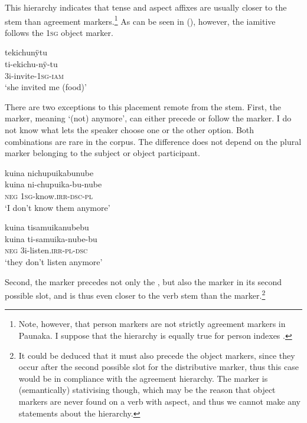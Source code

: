 This hierarchy indicates that tense and aspect affixes are usually closer to the stem than agreement markers.\footnote{Note, however, that person markers are not strictly agreement markers in Paunaka. I suppose that the hierarchy is equally true for person indexes \citep[for the term “index” see][]{Haspelmath2013}.} As can be seen in (), however, the iamitive follows the 1\textsc{sg} object marker.

\ea\label{ex:FirstTAME-3}
\begingl
\glpreamble tekichunÿtu\\
\gla ti-ekichu-nÿ-tu\\
\glb 3i-invite-1\textsc{sg}-\textsc{iam}\\
\glft ‘she invited me (food)’
\endgl
\trailingcitation{[jmx-e090727s.171]}
\xe

There are two exceptions to this placement remote from the stem. First, the  marker, meaning ‘(not) anymore’, can either precede or follow the  marker. I do not know what lets the speaker choose one or the other option. Both combinations are rare in the corpus. The difference does not depend on the plural marker belonging to the subject or object participant. %

\ea\label{ex:FirstTAME-4}
\begingl
\glpreamble kuina nichupuikabunube\\
\gla kuina ni-chupuika-bu-nube\\
\glb \textsc{neg} 1\textsc{sg}-know.\textsc{irr}-\textsc{dsc}-\textsc{pl}\\
\glft ‘I don’t know them anymore’
\endgl
\trailingcitation{[rxx-e181022le]}
\xe


\ea\label{ex:FirstTAME-5}
\begingl
\glpreamble kuina tisamuikanubebu\\
\gla kuina ti-samuika-nube-bu\\
\glb \textsc{neg} 3i-listen.\textsc{irr}-\textsc{pl}-\textsc{dsc}\\
\glft ‘they don’t listen anymore’
\endgl
\trailingcitation{[jxx-e190210s-01]}
\xe

Second, the  marker precedes not only the , but also the  marker in its second possible slot, and is thus even closer to the verb stem than the  marker.\footnote{It could be deduced that it must also precede the object markers, since they occur after the second possible slot for the distributive marker, thus this case would be in compliance with the agreement hierarchy. The  marker is (semantically) stativising though, which may be the reason that object markers are never found on a verb with  aspect, and thus we cannot make any statements about the hierarchy.}

